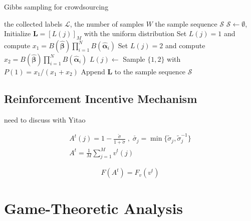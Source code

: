 \documentclass{article}
\begin{document}
\begin{algorithm}[tb]
   \caption{Gibbs sampling for crowdsourcing}
   \label{GSC}
   \small
\begin{algorithmic}
   \vspace{0.5mm}
    the collected labels $\mathcal{L}$, the number of samples $W$
    the sample sequence $\mathcal{S}$
   \vspace{0.5mm}
   \STATE $\mathcal{S}\leftarrow\emptyset$, Initialize $\bm{L}=[L(j)]_M$ with the uniform distribution
   \STATE Set $L(j)=1$ and compute $x_1= B(\hat{\bm{\beta}})\prod_{i=1}^{N}B(\hat{\bm{\alpha}}_{i})$
   \STATE Set $L(j)=2$ and compute $x_2= B(\hat{\bm{\beta}})\prod_{i=1}^{N}B(\hat{\bm{\alpha}}_{i})$
   \STATE $L(j)\leftarrow$ Sample $\{1,2\}$ with $P(1)=x_1/(x_1+x_2)$
   \ENDFOR
   \STATE Append $\bm{L}$ to the sample sequence $\mathcal{S}$
   \ENDFOR
\end{algorithmic}
\end{algorithm}


\subsection{Reinforcement Incentive Mechanism}
need to discuss with Yitao

\begin{equation}
\label{vot}
\begin{split}
A^t(j)=1-\frac{\check{\sigma}}{1+\check{\sigma}}\;,\;\check{\sigma_j}=\min\{\tilde{\sigma}_j, \tilde{\sigma}^{-1}_j\} \\  A^t = \frac{1}{M}\sum_{j=1}^{M}v^t(j)
\end{split}
\end{equation}

\begin{equation}
F(A^t)=F_v(v^t)
\end{equation}

\section{Game-Theoretic Analysis}
\end{document}
